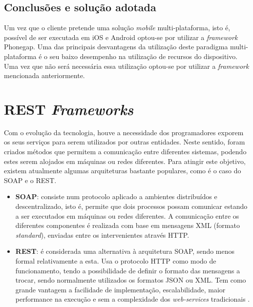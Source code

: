 \subsection{Conclusões e solução adotada}



Um vez que o cliente pretende uma solução \textit{mobile} multi-plataforma, isto é, possível de ser executada em iOS e Android optou-se por utilizar a \textit{framework} Phonegap.  Uma das principais desvantagens da utilização deste paradigma multi-plataforma é o seu baixo desempenho na utilização de recursos do dispositivo. Uma vez que não será necessária essa utilização optou-se por utilizar a \textit{framework} mencionada anteriormente. 




\section{REST \textit{Frameworks}}


Com o evolução da tecnologia, houve a necessidade dos programadores exporem os seus serviços para serem utilizados por outras entidades. Neste sentido, foram criados métodos que permitem a comunicação  entre diferentes sistemas, podendo estes serem alojados em máquinas ou redes diferentes. Para atingir este objetivo, existem atualmente algumas arquiteturas bastante populares, como é o caso do \ac{SOAP} e o \ac{REST}. 


\begin{itemize}
	\item \textbf{\ac{SOAP}}: consiste num protocolo aplicado a ambientes distribuídos e descentralizado, isto é, permite que dois processos possam comunicar estando a ser executados em máquinas ou redes diferentes\cite{Kang2015}. A comunicação entre os diferentes componentes é realizada com base em mensagens \ac{XML} (formato \textit{standard}), enviadas entre os intervenientes através \ac{HTTP}.
	
	
	\item \textbf{\ac{REST}}: é considerada uma alternativa à arquitetura \ac{SOAP}, sendo menos formal relativamente a esta. Usa o protocolo \ac{HTTP} como modo de funcionamento, tendo a possibilidade de definir o formato das mensagens a trocar, sendo normalmente utilizados os formatos \ac{JSON} ou \ac{XML}. Tem como grande vantagem a facilidade de implementação, escalabilidade, maior performance na execução e sem a complexidade dos \textit{web-services} tradicionais \cite{restpaper}. 
	
	
\end{itemize}

